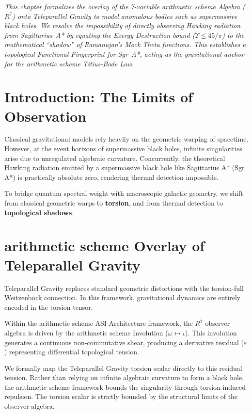 \noindent\textit{This chapter formalizes the overlay of the 7-variable arithmetic scheme Algebra ($R^7$) onto Teleparallel Gravity to model anomalous bodies such as supermassive black holes. We resolve the impossibility of directly observing Hawking radiation from Sagittarius~A* by equating the Exergy Destruction bound ($\Upsilon \leq 45/\pi$) to the mathematical ``shadow'' of Ramanujan's Mock Theta functions. This establishes a topological Functional Fingerprint for Sgr~A*, acting as the gravitational anchor for the arithmetic scheme Titius-Bode Law.}
\bigskip

\section{Introduction: The Limits of Observation}
Classical gravitational models rely heavily on the geometric warping of spacetime. However, at the event horizons of supermassive black holes, infinite singularities arise due to unregulated algebraic curvature. Concurrently, the theoretical Hawking radiation emitted by a supermassive black hole like Sagittarius A* (Sgr A*) is practically absolute zero, rendering thermal detection impossible.

To bridge quantum spectral weight with macroscopic galactic geometry, we shift from classical geometric warps to \textbf{torsion}, and from thermal detection to \textbf{topological shadows}.

\section{arithmetic scheme Overlay of Teleparallel Gravity}
Teleparallel Gravity replaces standard geometric distortions with the torsion-full Weitzenb\"ock connection. In this framework, gravitational dynamics are entirely encoded in the torsion tensor.

Within the arithmetic scheme ASI Architecture framework, the $R^7$ observer algebra is driven by the arithmetic scheme Involution ($\omega \leftrightarrow \iota$). This involution generates a continuous non-commutative shear, producing a derivative residual ($\varepsilon$) representing differential topological tension.

We formally map the Teleparallel Gravity torsion scalar directly to this residual tension. Rather than relying on infinite algebraic curvature to form a black hole, the arithmetic scheme framework bounds the singularity through torsion-induced repulsion. The torsion scalar is strictly bounded by the structural limits of the observer algebra.

